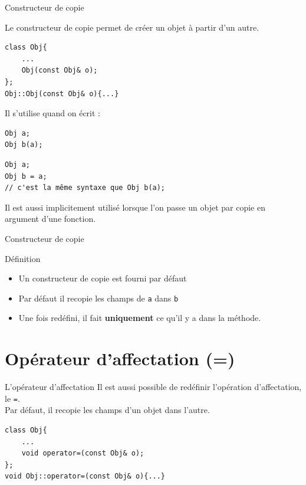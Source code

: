 \begin{frame}[fragile=singleslide]{Constructeur de copie}

    Le constructeur de copie permet de créer un objet à partir d'un autre.
            \begin{verbatim}
class Obj{
    ...
    Obj(const Obj& o);
};
Obj::Obj(const Obj& o){...}
            \end{verbatim}
        
    Il s'utilise quand on écrit :
    
\begin{minipage}{0.45\linewidth}
            \begin{verbatim}
Obj a;
Obj b(a);
            \end{verbatim}
\end{minipage}
\begin{minipage}{0.45\linewidth}
            \begin{verbatim}
Obj a;
Obj b = a;
// c'est la même syntaxe que Obj b(a);
            \end{verbatim}
\end{minipage}

    Il est aussi implicitement utilisé lorsque l'on passe un objet par copie en argument d'une fonction.
\end{frame}

\begin{frame}{Constructeur de copie}
    \begin{block}{Définition}
    \begin{itemize}
        \item Un constructeur de copie est fourni par défaut
        \item Par défaut il recopie les champs de \texttt{a} dans \texttt{b}
        \item Une fois redéfini, il fait \textbf{uniquement} ce qu'il y a dans la méthode.
    \end{itemize}
    \end{block}
\end{frame}

\section{Opérateur d'affectation (=)}

\begin{frame}[fragile=singleslide]{L'opérateur d'affectation}
    Il est aussi possible de redéfinir l'opération d'affectation, le \texttt{=}.\\
    Par défaut, il recopie les champs d'un objet dans l'autre.
    
        \begin{verbatim}
class Obj{
    ...
    void operator=(const Obj& o);
};
void Obj::operator=(const Obj& o){...}
        \end{verbatim}
\end{frame}

